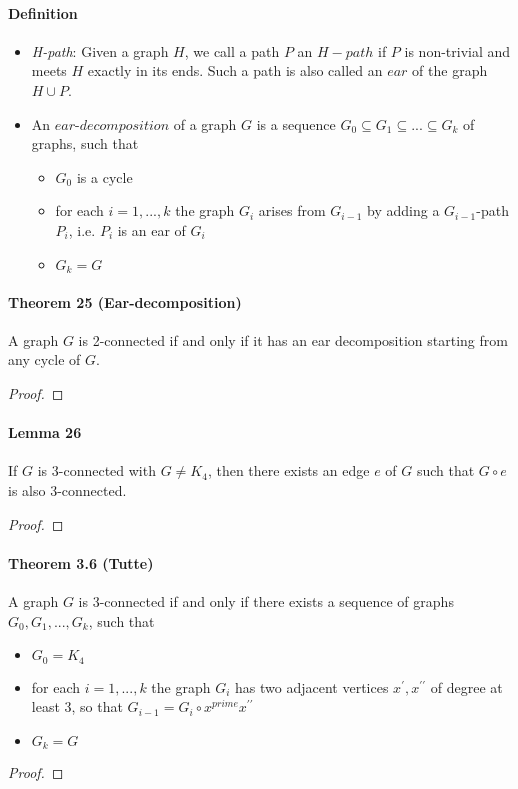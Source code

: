 \paragraph{Definition}
\begin{itemize}
    \item \textit{H-path}: Given a graph $ H $, we call a path $ P $ an $H-path$ 
    if $ P $ is non-trivial and meets $ H $ exactly in its ends. Such a path is also 
    called an $ ear $ of the graph $ H \cup P$.
    \item An $ear$-$decomposition$ of a graph $ G $ is a sequence $ G_0 \subseteq 
    G_1 \subseteq ... \subseteq G_k $ of graphs, such that 
        \begin{itemize}
            \item $G_0$ is a cycle
            \item for each $ i = 1,...,k$ the graph $ G_i $ arises from $ G_{i-1}$
            by adding a $ G_{i-1}$-path $P_i$, i.e. $P_i$ is an ear of $G_i$
            \item $G_k = G$
        \end{itemize} 
\end{itemize}

\paragraph{Theorem 25 (Ear-decomposition)} A graph $ G $ is 2-connected if and only 
if it has an ear decomposition starting from any cycle of $ G$.
\begin{proof}
{\color{red}{TODO}}
\end{proof}

\paragraph{Lemma 26} If $ G $ is 3-connected with $ G \neq K_4 $, then there exists 
an edge $ e $ of $ G $ such that $ G \circ e $ is also 3-connected.
\begin{proof}
 {\color{red}{TODO}}
\end{proof}

\paragraph{Theorem 3.6 (Tutte)} A graph $ G $ is 3-connected if and only if there 
exists a sequence of graphs $ G_0,G_1,...,G_k$, such that 
\begin{itemize}
    \item $G_0 = K_4$
    \item for each $ i = 1,...,k$ the graph $ G_i $ has two adjacent vertices $ x^\prime, 
    x^{\prime\prime} $ of degree at least 3, so that $ G_{i-1} = G_i \circ 
    x^{prime}x^{\prime\prime} $
    \item $ G_k = G$
\end{itemize}
\begin{proof}
  {\color{red}{TODO}}
\end{proof}

